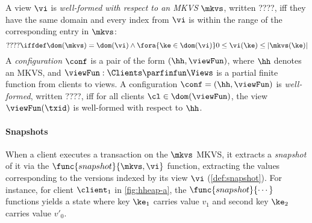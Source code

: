 \begin{definition}[Configurations]
A view $\vi$ is \emph{well-formed with respect to an MKVS} $\mkvs$, written ????,  iff they have the same domain and every index from $\vi$ is within the range of the corresponding entry in $\mkvs$: 
\[
   ???? \iffdef  \dom(\mkvs) = \dom(\vi) \land \fora{\ke \in \dom(\vi)} 0 \leq \vi(\ke) \le \lvert \mkvs(\ke) \rvert
\]
%
A \emph{configuration} $\conf$ is a pair of the form $(\hh, \viewFun)$, where $\hh$ denotes an MKVS, and $\viewFun: \Clients \parfinfun \Views$ is a partial finite function from clients to views. 
A configuration $\conf = (\hh, \viewFun)$ is \emph{well-formed}, written ????, iff for all clients $\cl \in \dom(\viewFun)$, the view $\viewFun(\txid)$ is well-formed with respect to $\hh$. 

\end{definition}

\paragraph{Snapshots} When a client executes a transaction on the $\mkvs$ MKVS, it extracts a \emph{snapshot} of it via the \( \func{snapshot}{\mkvs, \vi} \) function, extracting the values corresponding to the versions indexed by its view \( \vi \) (\cref{def:snapshot}).
For instance, for client \( \client_1 \) in \cref{fig:hheap-a}, the $\func{snapshot}{\cdots}$ functions yields a state where key $\ke_1$ carries value $v_1$ and second key \( \ke_2 \) carries value $v'_0$.

